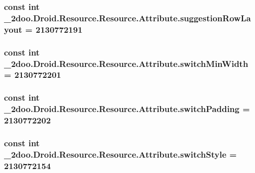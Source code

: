 \hypertarget{class__2doo_1_1_droid_1_1_resource_1_1_attribute_6c9b3f8e6bf978924fa6036c19fad631}{
\subsubsection[{suggestionRowLayout}]{\setlength{\rightskip}{0pt plus 5cm}const int \_\-2doo.Droid.Resource.Resource.Attribute.suggestionRowLayout = 2130772191}}
\label{class__2doo_1_1_droid_1_1_resource_1_1_attribute_6c9b3f8e6bf978924fa6036c19fad631}


\hypertarget{class__2doo_1_1_droid_1_1_resource_1_1_attribute_c2952afd6bc9250adc3de827b83fd7f8}{
\subsubsection[{switchMinWidth}]{\setlength{\rightskip}{0pt plus 5cm}const int \_\-2doo.Droid.Resource.Resource.Attribute.switchMinWidth = 2130772201}}
\label{class__2doo_1_1_droid_1_1_resource_1_1_attribute_c2952afd6bc9250adc3de827b83fd7f8}


\hypertarget{class__2doo_1_1_droid_1_1_resource_1_1_attribute_4e127d6a82e090fe6ad55e47984be26f}{
\subsubsection[{switchPadding}]{\setlength{\rightskip}{0pt plus 5cm}const int \_\-2doo.Droid.Resource.Resource.Attribute.switchPadding = 2130772202}}
\label{class__2doo_1_1_droid_1_1_resource_1_1_attribute_4e127d6a82e090fe6ad55e47984be26f}


\hypertarget{class__2doo_1_1_droid_1_1_resource_1_1_attribute_5c3e01d39a4353b2ca29377972b2a448}{
\subsubsection[{switchStyle}]{\setlength{\rightskip}{0pt plus 5cm}const int \_\-2doo.Droid.Resource.Resource.Attribute.switchStyle = 2130772154}}
\label{class__2doo_1_1_droid_1_1_resource_1_1_attribute_5c3e01d39a4353b2ca29377972b2a448}


